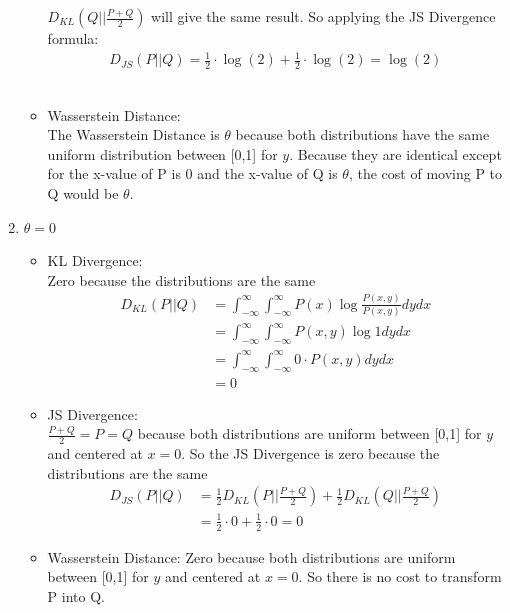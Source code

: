 \documentclass{article}
\begin{document}
\begin{enumerate}[label=\alph*)]
\begin{itemize}
            $D_{KL}(Q||\frac{P+Q}{2})$ will give the same result. So applying the JS Divergence formula:
            \begin{equation}
                \begin{aligned}
                    D_{JS}(P||Q) = \frac{1}{2} \cdot \log(2) + \frac{1}{2} \cdot \log(2) = \log(2)
                \end{aligned}
            \end{equation}
            \\
            \item Wasserstein Distance: \\ The Wasserstein Distance is $\theta$ because both distributions have the same uniform distribution between [0,1] for $y$. 
            Because they are identical except for the x-value of P is 0 and the x-value of Q is $\theta$, the cost of moving P to Q would be $\theta$.
        \end{itemize}  
    \item $\theta = 0$
        \begin{itemize}
            \item KL Divergence: \\ Zero because the distributions are the same
            \begin{equation}
                \begin{aligned}
                    D_{KL}(P||Q) &= \int_{-\infty}^{\infty} \int_{-\infty}^{\infty} P(x)\log \frac{P(x,y)}{P(x,y)}dydx\\
                    &= \int_{-\infty}^{\infty} \int_{-\infty}^{\infty} P(x,y)\log1 dydx\\
                    &= \int_{-\infty}^{\infty} \int_{-\infty}^{\infty} 0\cdot P(x,y)  dydx\\
                    &= 0
                \end{aligned}
            \end{equation}
            \item JS Divergence: \\ $\frac{P+Q}{2} = P = Q$ because both distributions are uniform between [0,1] for $y$ and centered at $x = 0$. So the JS Divergence is zero because the distributions are the same
            \begin{equation}
                \begin{aligned}
                    D_{JS}(P||Q) &= \frac{1}{2}D_{KL}(P||\frac{P+Q}{2}) + \frac{1}{2}D_{KL}(Q||\frac{P+Q}{2}) \\
                                 &= \frac{1}{2} \cdot 0 + \frac{1}{2} \cdot 0 = 0
                \end{aligned}
            \end{equation}
            \item Wasserstein Distance: Zero because both distributions are uniform between [0,1] for $y$ and centered at $x = 0$. So there is no cost to transform P into Q.
    

\end{itemize}
\end{enumerate}
\end{document}
